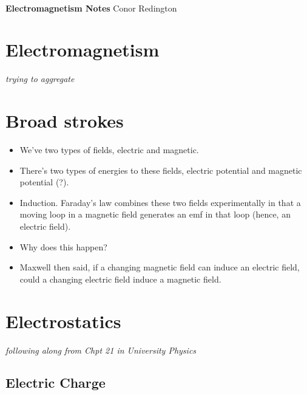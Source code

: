 \documentclass[11pt]{article}
\begin{document}
\thispagestyle{empty}
\bigskip \
\vspace{0.1cm}

\begin{center}
{\fontsize{36}{36} \selectfont \bf \sffamily Electromagnetism Notes}
\vskip 24pt
{\fontsize{18}{18} \selectfont \rmfamily Conor Redington} 
\vskip 24pt
\end{center}

{\parindent0pt \baselineskip=15.5pt \lipsum[1-4]}

\newpage
\microtoc
\newpage

\hypertarget{electromagnetism}{%
\section{Electromagnetism}\label{electromagnetism}}

\emph{trying to aggregate}

\hypertarget{broad-strokes}{%
\section{Broad strokes}\label{broad-strokes}}

\begin{itemize}
\tightlist
\item
  We've two types of fields, electric and magnetic.
\item
  There's two types of energies to these fields, electric potential and
  magnetic potential (?).
\item
  Induction. Faraday's law combines these two fields experimentally in
  that a moving loop in a magnetic field generates an emf in that loop
  (hence, an electric field).
\item
  Why does this happen?
\item
  Maxwell then said, if a changing magnetic field can induce an electric
  field, could a changing electric field induce a magnetic field.
\end{itemize}

\hypertarget{electrostatics}{%
\section{Electrostatics}\label{electrostatics}}

\emph{following along from Chpt 21 in University Physics}

\hypertarget{electric-charge}{%
\subsection{Electric Charge}\label{electric-charge}}
\end{document}
